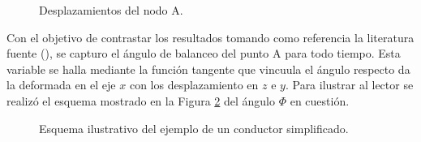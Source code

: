 \begingroup
\centering
\begin{figure}[htbp]
	\centering
	\caption{Desplazamientos del nodo A.} \label{fig:RN:FotiCable:DispsA}
\end{figure}
\endgroup


Con el objetivo de contrastar los resultados tomando como referencia la literatura fuente (\textcite{foti2018finite}), se capturo el ángulo de balanceo del punto $\text{A}$ para todo tiempo. Esta variable se halla mediante la función tangente que vincuula el ángulo respecto da la deformada en el eje $x$ con los desplazamiento en $z$ e $y$. Para ilustrar al lector se realizó el esquema mostrado en la Figura \ref{fig:RN:FotiCable:Angulo} del ángulo $\Phi$ en cuestión.

\begin{figure}[htbp]
	\centering
	\def\svgwidth{80mm}
	
	\caption{Esquema ilustrativo del ejemplo de un conductor simplificado.}
	\label{fig:RN:FotiCable:Angulo}
\end{figure}


